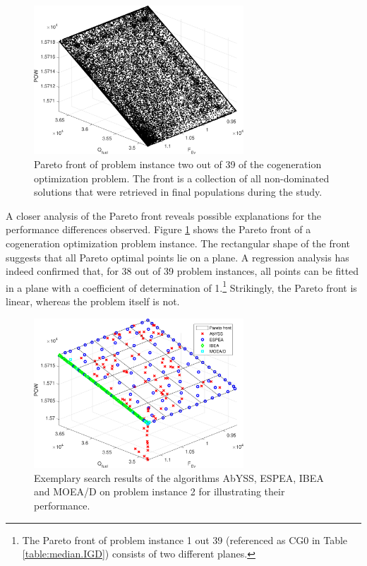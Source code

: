 \begin{figure}
\centering
\includegraphics[width=0.7\textwidth]{figures/paretofront_cropped.pdf}
\caption{Pareto front of problem instance two out of 39 of the cogeneration optimization problem. The front is a collection of all non-dominated solutions that were retrieved in final populations during the study.}
\label{fig:paretofront}
\end{figure}

A closer analysis of the Pareto front reveals possible explanations for the performance differences observed. Figure \ref{fig:paretofront} shows the Pareto front of a cogeneration optimization problem instance. The rectangular shape of the front suggests that all Pareto optimal points lie on a plane. A regression analysis has indeed confirmed that, for 38 out of 39 problem instances, all points can be fitted in a plane with a coefficient of determination of 1.\footnote{The Pareto front of problem instance 1 out 39 (referenced as CG0 in Table \ref{table:median.IGD}) consists of two different planes.} Strikingly, the Pareto front is linear, whereas the problem itself is not.

\begin{figure}
\centering
\includegraphics[width=0.7\textwidth]{figures/example1_cropped.pdf}
\caption{Exemplary search results of the algorithms AbYSS, ESPEA, IBEA and MOEA/D on problem instance 2 for illustrating their performance.}
\label{fig:exruns1}
\end{figure}

